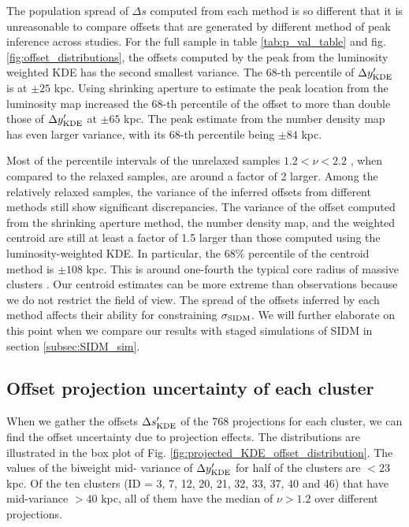 The population spread of $\Delta s$ computed from each 
method is so different that it is unreasonable to compare offsets that are generated 
by different method of peak inference across studies.
For the full sample in table \ref{tab:p_val_table} and fig. 
\ref{fig:offset_distributions},
the offsets computed by the peak from the luminosity weighted KDE 
has the second smallest variance. The 68-th percentile of $\Delta y_{\rm
KDE}'$ is at $\pm 25$ kpc. Using shrinking aperture to estimate
the peak location from the luminosity map increased the 68-th percentile of the
offset to more than double those of $\Delta y_{\rm KDE}'$ at $\pm 65$ kpc.
The peak estimate from the number density map has even larger variance, 
with its 68-th percentile being $\pm 84$ kpc. 

Most of the percentile intervals of the unrelaxed samples $ 1.2 < \nu < 2.2$ , 
when compared to the relaxed samples, are around a factor of 2 larger. 
Among the relatively relaxed samples, the variance of the inferred offsets from different
methods still show significant discrepancies. 
The variance of the offset computed from the shrinking aperture method, 
the number density map, and the weighted centroid are still at least a factor of 1.5
larger than those computed using the luminosity-weighted KDE. 
In particular, the 68\% percentile of the centroid method is $\pm 108$ kpc.
This is around one-fourth the typical core radius of massive clusters
\citep{Allen1998}. Our centroid estimates can be more extreme than observations
because we do not restrict the field of view.
The spread of the offsets inferred by each method affects their ability
for constraining $\sigma_{\rm SIDM}$. We will further elaborate on this point
when we compare our results with staged simulations of SIDM in section
\ref{subsec:SIDM_sim}. 


\subsection{Offset projection uncertainty of each cluster}
\label{subsec:projections}
When we gather the offsets $\Delta s_{\rm KDE}'$ of the 
768 projections for each cluster,
we can find the offset uncertainty due to projection effects.
The distributions are illustrated in the box plot of Fig. 
\ref{fig:projected_KDE_offset_distribution}. The values of the biweight mid-
variance of $\Delta y_{\rm KDE}'$ for half of the clusters
are $< 23$ kpc. Of the ten clusters (ID = 3, 7, 12, 20, 21, 32, 33, 37, 40 and 46) 
that have mid-variance $ > 40$ kpc, all of them have the median of $\nu > 1.2$
over different projections.
 
